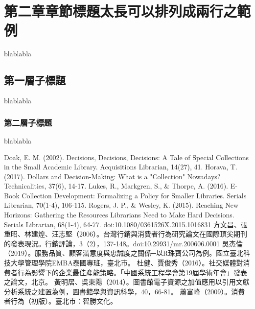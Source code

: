 \documentclass[12pt]{ncut}
\begin{document}
\newpage

\section{第二章章節標題太長可以排列成兩行之範例}
blablabla
\subsection{第一層子標題}
blablabla
\subsubsection{第二層子標題}
blablabla

\newpage

\newpage
\begin{thebibliography}{9}
  Doak, E. M. (2002). Decisions, Decisions, Decisions: A Tale of Special Collections in the Small Academic Library. Acquisitions Librarian, 14(27), 41. 
Horava, T. (2017). Dollars and Decision-Making: What is a "Collection" Nowadays? Technicalities, 37(6), 14-17. 
Lukes, R., Markgren, S., \& Thorpe, A. (2016). E-Book Collection Development: Formalizing a Policy for Smaller Libraries. Serials Librarian, 70(1-4), 106-115.
Rogers, J. P., \& Wesley, K. (2015). Reaching New Horizons: Gathering the Resources Librarians Need to Make Hard Decisions. Serials Librarian, 68(1-4), 64-77. doi:10.1080/0361526X.2015.1016831
方文昌、張重昭、林建煌、汪志堅（2006）。台灣行銷與消費者行為研究論文在國際頂尖期刊的發表現況。行銷評論，3（2），137-148。doi:10.29931/mr.200606.0001
吳杰倫（2019）。服務品質、顧客滿意度與忠誠度之關係─以R珠寶公司為例。國立臺北科技大學管理學院EMBA泰國專班，臺北市。
杜健、賈俊秀（2016）。社交媒體對消費者行為影響下的企業最佳產能策略。「中國系統工程學會第19屆學術年會」發表之論文，北京。
黃明居、吳東陽（2014）。圖書館電子資源之加值應用以引用文獻分析系統之建置為例，圖書館學與資訊科學，40，66-81。
蕭富峰（2009）。消費者行為（初版）。臺北市：智勝文化。
\end{thebibliography}
\end{document}
